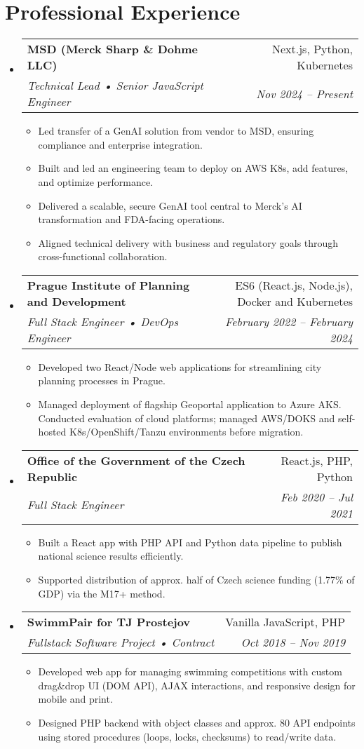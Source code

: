 \documentclass[letterpaper,11pt]{article}
\makeatletter
\newcommand{\sitem}[1]{\item #1 \vspace{-2pt}}
\newcommand{\resumeSubheading}[4]{
  \vspace{-1pt}\item
    \begin{tabular*}{0.97\textwidth}[t]{l@{\extracolsep{\fill}}r}
      \textbf{#1} & #2 \\
      \textit{\small#3} & \textit{\small #4} \\
    \end{tabular*}\vspace{-5pt}
}
\newenvironment{subheadingListing}{\begin{itemize}[leftmargin=*]}{\end{itemize}}
\newenvironment{resumeList}{\begin{itemize}}{\end{itemize}\vspace{-5pt}}
\makeatother
\begin{document}
\section{Professional Experience}
\begin{subheadingListing}
  \resumeSubheading
  {MSD (Merck Sharp \& Dohme LLC)}{Next.js, Python, Kubernetes}
  { Technical Lead • Senior JavaScript Engineer}{Nov 2024 – Present}
  \begin{resumeList}
    \sitem{Led transfer of a GenAI solution from vendor to MSD, ensuring compliance and enterprise integration.}
    \sitem{Built and led an engineering team to deploy on AWS K8s, add features, and optimize performance.}
    \sitem{Delivered a scalable, secure GenAI tool central to Merck’s AI transformation and FDA-facing operations.}
    \sitem{Aligned technical delivery with business and regulatory goals through cross-functional collaboration.}
  \end{resumeList}

  \resumeSubheading
  {Prague Institute of Planning and Development}{ES6 (React.js, Node.js), Docker and Kubernetes}
  {Full Stack Engineer • DevOps Engineer}{February 2022 – February 2024}
  \begin{resumeList}
    \sitem{Developed two React/Node web applications for streamlining city planning processes in Prague.}
    \sitem{Managed deployment of flagship Geoportal application to Azure AKS. Conducted evaluation of cloud platforms; managed AWS/DOKS and self-hosted K8s/OpenShift/Tanzu environments before migration.}
  \end{resumeList}

  \resumeSubheading
    {Office of the Government of the Czech Republic}{React.js, PHP, Python}
    {Full Stack Engineer}{Feb 2020 – Jul 2021}
    \begin{resumeList}
      \sitem{Built a React app with PHP API and Python data pipeline to publish national science results efficiently.}
      \sitem{Supported distribution of approx. half of Czech science funding (1.77\% of GDP) via the M17+ method.}
    \end{resumeList}

\resumeSubheading
{SwimmPair for TJ Prostejov}{Vanilla JavaScript, PHP}
{Fullstack Software Project • Contract}{Oct 2018 – Nov 2019}
\begin{resumeList}
  \sitem{Developed web app for managing swimming competitions with custom drag\&drop UI (DOM API), AJAX interactions, and responsive design for mobile and print.}
  \sitem{Designed PHP backend with object classes and approx. 80 API endpoints using stored procedures (loops, locks, checksums) to read/write data.}
\end{resumeList}



\end{subheadingListing}
\end{document}
